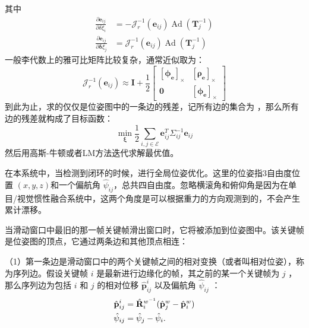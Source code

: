 其中
\begin{equation}
\label{eqn:4.42}
\begin{aligned}
\frac{\partial \boldsymbol{e}_{i j}}{\partial \delta \xi_{i}} &= -\bm{\mathcal{J}}_{r}^{-1}\left(\boldsymbol{e}_{i j}\right) \operatorname{Ad}\left(\boldsymbol{T}_{j}^{-1}\right) \\
\frac{\partial \boldsymbol{e}_{i j}}{\partial \boldsymbol{\delta} \xi_{j}} &= \bm{\mathcal{J}}_{r}^{-1}\left(\boldsymbol{e}_{i j}\right) \operatorname{Ad}\left(\boldsymbol{T}_{j}^{-1}\right)
\end{aligned}
\end{equation}
一般李代数上的雅可比矩阵比较复杂，通常近似取为：
\begin{equation}
\label{eqn:4.43}
\bm{\mathcal{J}}_{r}^{-1}\left(\boldsymbol{e}_{i j}\right) \approx 
\boldsymbol{I}+\frac{1}{2} \left[ 
\begin{array}{cc}
{\left[\boldsymbol{\phi}_{\boldsymbol{e}} \right]_\times} & { \left[ \boldsymbol{\rho}_{\boldsymbol{e}} \right]_\times } \\ 
{\mathbf{0}} & { \left[\bm{\phi}_{\boldsymbol{e}}\right]_\times}
\end{array}
\right]
\end{equation}
到此为止，求的仅仅是位姿图中的一条边的残差，记所有边的集合为 ，那么所有边的残差就构成了目标函数：
\begin{equation}
\label{eqn:4.44}
\min _{\bm{\xi}} \frac{1}{2} \sum_{i, j \in \mathcal{E}} \bm{e}_{i j}^{T} \Sigma_{i j}^{-1} \bm{e}_{i j}
\end{equation}
然后用高斯-牛顿或者LM方法迭代求解最优值。

在本系统中，当检测到闭环的时候，进行全局位姿优化。这里的位姿指3自由度位置 $(x,y,z) $和一个偏航角 $\hat{\psi}_{ij} $，总共四自由度。忽略横滚角和俯仰角是因为在单目/视觉惯性融合系统中，这两个角度是可以根据重力的方向观测到的，不会产生累计漂移。

当滑动窗口中最旧的那一帧关键帧滑出窗口时，它将被添加到位姿图中。该关键帧是位姿图的顶点，它通过两条边和其他顶点相连：

（1）第一条边是滑动窗口中的两个关键帧之间的相对变换（或者叫相对位姿），称为序列边。假设关键帧 $i$ 是最新进行边缘化的帧，其之前的某一个关键帧为 $j$ ，那么序列边为包括 $i$ 和 $j$ 的相对位移 $\hat{\mathbf{p}}_{ij}^i $ 以及偏航角 $\hat{\psi}_{ij} $ ：
\begin{equation}
\label{eqn:4.45}
\setlength{\abovedisplayskip}{6pt}
\setlength{\belowdisplayskip}{6pt}
\begin{split}
\hat{\mathbf{p}}_{ij}^i&=\hat{\mathbf{R}}_i^{w^{-1}}(\hat{\mathbf{p}}_j^w-\hat{\mathbf{p}}_i^w) \\
\hat{\psi}_{ij}&=\hat{\psi}_j-\hat{\psi}_i.
\end{split}
\end{equation}

